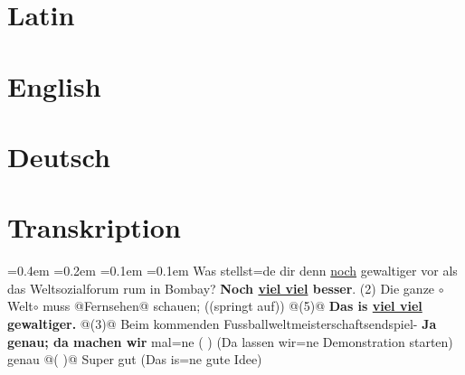 \documentclass[oneside,12pt,headlines=1.5, chapterprefix=false, numberedsection=nolabel, nonumberlist,BCOR12mm,abstract]{scrreprt}
\begin{document}
\maketitle

\section*{Latin}
\selectlanguage{\latin}
\blindtext 

\section*{English}
\selectlanguage{\english}
\blindtext 

\section*{Deutsch}
\selectlanguage{\ngerman}
\blindtext 

\section*{Transkription}
\linenumbers[21]
\begin{dialogue}
\ttfamily
{}\font=0.4em
\font=0.2em
\font=0.1em
\font=0.1em
 Was stellst=de dir denn  \uline{noch} gewaltiger vor als das
Weltsozialforum rum in Bombay?
 \textbf{Noch \uline{viel viel} besser}. (2) Die ganze {$\circ$}Welt{$\circ$} muss
@Fernsehen@ schauen; ((springt auf))
 \hspace{2em}{$\lfloor$}  @(5)@
 \textbf{Das is \uline{viel viel} gewaltiger.}
 \hspace{13.75em}{$\lfloor$} @(3)@
 Beim kommenden Fussballweltmeisterschaftsendspiel-
 \textbf{Ja genau; da machen wir} mal=ne ( \hspace{5.5em} )
 \hspace{8em}{$\lfloor$} (Da lassen wir=ne Demonstration starten)
genau
 \hspace{5em}{$\lfloor$} @( \hspace{21.5em} )@
 \hspace{9em}{$\lfloor$} Super gut \hspace{8.5em}{$\lfloor$} (Das
is=ne gute Idee)
\end{dialogue} 
\par
\nolinenumbers
\parskip 11pt

\end{document}
